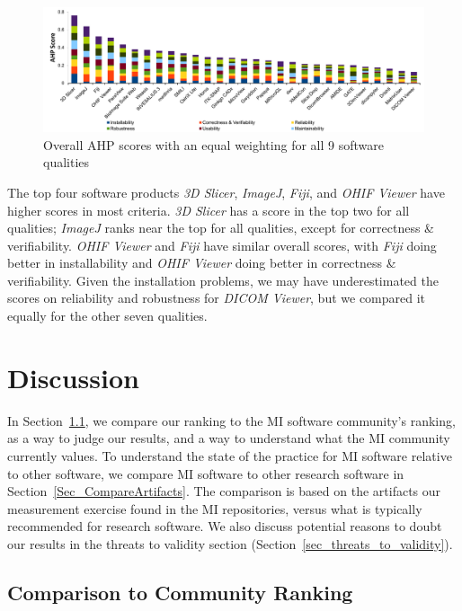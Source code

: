 \documentclass[11pt]{article}
\begin{document}
\begin{figure}[!ht]
\includegraphics[scale=0.47]{overall_scores.pdf}
\caption{Overall AHP scores with an equal weighting for all 9 software qualities}

\label{fg_overall_scores}
\end{figure}

The top four software products \textit{3D Slicer}, \textit{ImageJ},
\textit{Fiji}, and \textit{OHIF Viewer} have higher scores in most criteria.
\textit{3D Slicer} has a score in the top two for all qualities; \textit{ImageJ}
ranks near the top for all qualities, except for correctness \& verifiability.
\textit{OHIF Viewer} and \textit{Fiji} have similar overall scores, with
\textit{Fiji} doing better in installability and \textit{OHIF Viewer} doing
better in correctness \& verifiability.  Given the installation problems, we may
have underestimated the scores on reliability and robustness for \textit{DICOM
Viewer}, but we compared it equally for the other seven qualities.

\section{Discussion}

In Section~\ref{Sec_VsCommunityRanking}, we compare our ranking to the MI
software community's ranking, as a way to judge our results, and a way to
understand what the MI community currently values. To understand the state of
the practice for MI software relative to other software, we compare MI software
to other research software in Section~\ref{Sec_CompareArtifacts}.  The
comparison is based on the artifacts our measurement exercise found in the MI
repositories, versus what is typically recommended for research software.  We
also discuss potential reasons to doubt our results in the threats to validity
section (Section~\ref{sec_threats_to_validity}).

\subsection{Comparison to Community Ranking} \label{Sec_VsCommunityRanking}
\end{document}
